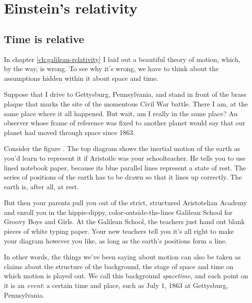 \chapter{Einstein's relativity}

\section{Time is relative}

In chapter \ref{ch:galilean-relativity} I laid out a beautiful theory of motion, which,
by the way, is wrong. To see why it's wrong, we have to think about the assumptions hidden
within it about space and time.

Suppose that I drive to
Gettysburg, Pennsylvania, and stand in front of the brass plaque that marks the site of
the momentous Civil War battle. There I am, at the same place where it all happened.
But wait, am I really in the same place? An observer whose frame of
reference was fixed to another planet would say that our planet had moved through space since 1863.

\vfill\pagebreak

Consider the figure . The top diagram shows the inertial motion of the earth
as you'd learn to represent it if Aristotle was your schoolteacher. He tells you to use lined notebook
paper, because its blue parallel lines represent a state of rest. The series of positions of the earth
has to be drawn so that it lines up correctly. The earth is, after all, at rest.

\begin{figure}\label{fig:no-simulplaceity}
\end{figure}

But then your parents pull you out of the strict, structured Aristotelian Academy
and enroll you in the hippie-dippy,
color-outside-the-lines Galilean School for Groovy Boys and Girls.
At the Galilean School, the teachers just hand out blank pieces of white typing paper.
Your new teachers tell you it's all right to make your diagram however you like, as
long as the earth's positions form a line.

In other words, the things we've been saying about motion can also be taken as claims about
the structure of the background, the stage of space and time on which motion is played out.
We call this background \emph{spacetime}, and each point on it is an \emph{event}: a certain time and
place, such as July 1, 1863 at Gettysburg, Pennsylvania.

